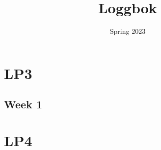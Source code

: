 \documentclass{article}
\title{Loggbok}
\date{Spring 2023}
\newcommand{\logentry}[2]{
    \subsection{Week #2}
    
    \newpage
}
\begin{document}
\maketitle
\newpage
\tableofcontents
\newpage


\section{LP3}
    \logentry{3}{1}

\section{LP4}
\end{document}

